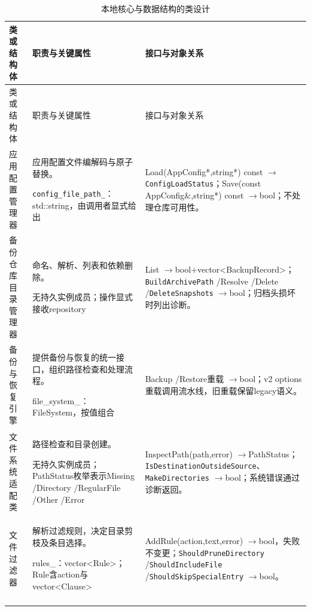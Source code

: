 \begin{longtable}{@{}L{.22\linewidth}L{.34\linewidth}L{.38\linewidth}@{}}
\caption{本地核心与数据结构的类设计}\label{tab:classes-1}\\
\toprule 类或结构体 & 职责与关键属性 & 接口与对象关系\\\midrule\endfirsthead
\toprule 类或结构体 & 职责与关键属性 & 接口与对象关系\\\midrule\endhead
\bottomrule\endfoot

应用配置管理器\par{} & 应用配置文件编解码与原子替换。\par \nolinkurl{config\_file\_path\_}：std::string，由调用者显式给出 & Load(AppConfig*,string*) const $\to$\allowbreak \nolinkurl{ConfigLoadStatus}；Save(const AppConfig\&,string*) const $\to$\allowbreak bool；不处理仓库可用性。\\\addlinespace[4pt]

备份仓库目录管理器\par{} & 命名、解析、列表和依赖删除。\par 无持久实例成员；操作显式接收repository & List $\to$\allowbreak bool+\allowbreak vector<\allowbreak BackupRecord>\allowbreak ；\nolinkurl{BuildArchivePath} /\allowbreak Resolve /\allowbreak Delete /\allowbreak \nolinkurl{DeleteSnapshots} $\to$\allowbreak bool；归档头损坏时列出诊断。\\\addlinespace[4pt]

备份与恢复引擎\par{} & 提供备份与恢复的统一接口，组织路径检查和处理流程。\par file\_system\_：FileSystem，按值组合 & Backup /\allowbreak Restore重载 $\to$\allowbreak bool；v2 options重载调用流水线，旧重载保留legacy语义。\\\addlinespace[4pt]

文件系统适配类\par{} & 路径检查和目录创建。\par 无持久实例成员；PathStatus枚举表示Missing /\allowbreak Directory /\allowbreak RegularFile /\allowbreak Other /\allowbreak Error & InspectPath(path,error) $\to$\allowbreak PathStatus；\nolinkurl{IsDestinationOutsideSource}、\nolinkurl{MakeDirectories} $\to$\allowbreak bool；系统错误通过诊断返回。\\\addlinespace[4pt]

文件过滤器\par{} & 解析过滤规则，决定目录剪枝及条目选择。\par rules\_：vector<\allowbreak Rule>\allowbreak ；Rule含action与vector<\allowbreak Clause>\allowbreak  & AddRule(action,text,error) $\to$\allowbreak bool，失败不变更；\nolinkurl{ShouldPruneDirectory} /\allowbreak \nolinkurl{ShouldIncludeFile} /\allowbreak \nolinkurl{ShouldSkipSpecialEntry} $\to$\allowbreak bool。\\\addlinespace[4pt]


\end{longtable}
